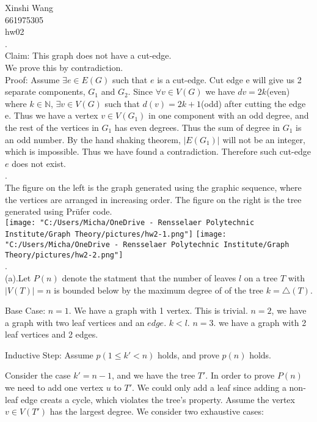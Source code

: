 \documentclass[12pt]{article}
\begin{document}
	\noindent Xinshi Wang\\
	661975305\\
	hw02\\
	
	.\\
	Claim: This graph does not have a cut-edge.\\
	We prove this by contradiction.\\
	Proof: Assume $\exists e \in E(G)$ such that $e$ is a cut-edge. Cut edge e will give us 2 separate components, $G_1$ and $G_2$. Since $\forall v \in V(G)$ we have $dv = 2k$(even) where $k \in \mathbb{N}$, $\exists v \in V(G)$ such that $d(v) = 2k+1$(odd) after cutting the edge e. Thus we have a vertex $v \in V(G_1)$ in one component with an odd degree, and the rest of the vertices in $G_1$ has even degrees. Thus the sum of degree in $G_1$ is an odd number. By the hand shaking theorem, $|E(G_1)|$ will not be an integer, which is impossible. Thus we have found a contradiction. Therefore such cut-edge $e$ does not exist.\\
	
	.\\
	The figure on the left is the graph generated using the graphic sequence, where the vertices are arranged in increasing order. The figure on the right is the tree generated using Prüfer code. \\
	\texttt{[image: "C:/Users/Micha/OneDrive - Rensselaer Polytechnic Institute/Graph Theory/pictures/hw2-1.png"]}
	\texttt{[image: "C:/Users/Micha/OneDrive - Rensselaer Polytechnic Institute/Graph Theory/pictures/hw2-2.png"]}\\
	
	.\\
	(a).Let $P(n)$ denote the statment that the number of leaves $l$
	on a tree $T$ with $|V(T)| = n$ is bounded below by the maximum degree of of the tree $k = \triangle(T)$.
	
	Base Case: $n = 1$. We have a graph with 1 vertex. This is trivial. $n=2$, we have a graph with two leaf vertices and an $edge$. $k < l$. $n = 3$. we have a graph with 2 leaf vertices and 2 edges.
	
	Inductive Step: Assume $p(1 \leq k' < n)$ holds, and prove $p(n)$ holds.
	
	Consider the case $k' = n-1$, and we have the tree $T'$. In order to prove $P(n)$ we need to add one vertex $u$ to $T'$. We could only add a leaf since adding a non-leaf edge creats a cycle, which violates the tree's property. Assume the vertex $v \in V(T')$ has the largest degree. We consider two exhaustive cases:
	
\end{document}
